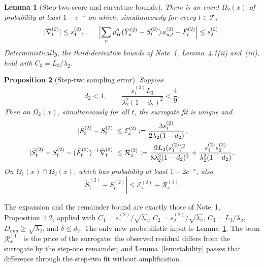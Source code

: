\documentclass[11pt]{article}
\newcommand{\eqdef}{\mathrel{\vcentcolon=}}
\newcommand{\Data}{Y}
\newcommand{\IMFs}{S}
\newcommand{\IMFt}{\widetilde S}
\newcommand{\IMFb}{\bar S}
\newcommand{\IF}{F}
\newtheorem{proposition}{Proposition}
\newtheorem{lemma}[proposition]{Lemma}
\theoremstyle{definition}
\begin{document}
\begin{lemma}[Step-two score and curvature bounds]\label{lem:step2-local}
There is an event \(\Omega_2(x)\) of probability at least \(1-e^{-x}\) on
which, simultaneously for every \(t\in\mathcal T\),
\begin{equation}
  |\bar\nabla^{(2)}_t|\leq s^{(2)}_1,
  \qquad
  \Bigl|\sum_u\rho_H''(\bar\Data^{(2)}_u-\IMFs^{(2)}_t)\,a^{(2)}_{u,t}
        -\bar\IF^{(2)}_t\Bigr|\leq s^{(2)}_2.
  \label{eq:step2-lemma}
\end{equation}
Deterministically, the third-derivative bounds of Note~1, Lemma~4.1(ii)
and~(iii), hold with \(C_3=L_3/\lambda_2\).
\end{lemma}

\begin{proposition}[Step-two sampling error]\label{prop:step2-sampling}
Suppose
\begin{equation}
  d_2<1,\qquad
  \frac{s^{(2)}_1L_3}{\lambda_2^2(1-d_2)^2}<\frac49.
  \label{eq:step2-smallness}
\end{equation}
Then on \(\Omega_2(x)\), simultaneously for all \(t\), the surrogate fit is
unique and
\begin{align}
  |\IMFb^{(2)}_t-\IMFs^{(2)}_t|
    &\leq\mathcal E^{(2)}_x\eqdef\frac{3s^{(2)}_1}{2\lambda_2(1-d_2)},
  \notag\\
  |\IMFb^{(2)}_t-\IMFs^{(2)}_t-(\bar\IF^{(2)}_t)^{-1}\bar\nabla^{(2)}_t|
    &\leq\mathcal R^{(2)}_x
    \eqdef\frac{9L_3(s^{(2)}_1)^2}{8\lambda_2^3(1-d_2)^3}
          +\frac{s^{(2)}_1s^{(2)}_2}{\lambda_2^2(1-d_2)}.
  \label{eq:step2-surrogate-bounds}
\end{align}
On \(\Omega_1(x)\cap\Omega_2(x)\), which has probability at least
\(1-2e^{-x}\), also
\begin{equation}
  |\IMFt^{(2)}_t-\IMFs^{(2)}_t|
    \leq\mathcal E^{(2)}_x+\mathcal R^{(1)}_x.
  \label{eq:step2-sampling-bound}
\end{equation}
\end{proposition}

The expansion and the remainder bound are exactly those of Note~1,
Proposition~4.2, applied with
\(C_1=s^{(2)}_1/\sqrt{\lambda_2}\), \(C_2=s^{(2)}_2/\sqrt{\lambda_2}\),
\(C_3=L_3/\lambda_2\), \(D_{\min}\geq\sqrt{\lambda_2}\), and
\(\delta\leq d_2\).  The only new probabilistic input is
Lemma~\ref{lem:step2-local}.  The term \(\mathcal R^{(1)}_x\) is the price
of the surrogate: the observed residual differs from the surrogate by the
step-one remainder, and Lemma~\ref{lem:stability} passes that difference
through the step-two fit without amplification.
\end{document}
